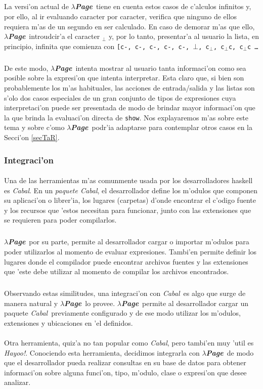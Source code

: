 \documentclass[a4paper]{article}
\newcommand{\hpage}{\textbf{\textsl{$\lambda$Page}}}
\newcommand{\cabal}{\textsl{Cabal}}
\begin{document}
\subparagraph{}La versi'on actual de \hpage\ tiene en cuenta estos casos de c'alculos infinitos y, por ello, al ir evaluando caracter por caracter, verifica que ninguno de ellos requiera m'as de un segundo en ser calculado.  En caso de demorar m'as que ello, \hpage\ introudcir'a el caracter  $_{\bot}$ y, por lo tanto, presentar'a al usuario la lista, en principio, infinita que comienza con \texttt{[c-, c-, c-, c-, c-, $\bot$, c$_{\bot}$, c$_{\bot}$c, c$_{\bot}$c \ldots}
\subparagraph{}De este modo, \hpage\ intenta mostrar al usuario tanta informaci'on como sea posible sobre la expresi'on que intenta interpretar.  Esta claro que, si bien son probablemente los m'as habituales, las acciones de entrada/salida y las listas son s'olo dos casos especiales de un gran conjunto de tipos de expresiones cuya interpretaci'on puede ser presentada de modo de brindar mayor informaci'on que la que brinda la evaluaci'on directa de \texttt{show}.  Nos explayaremos m'as sobre este tema y sobre c'omo \hpage\ podr'ia adaptarse para contemplar otros casos en la Secci'on \ref{secTaR}.

\subsubsection{Integraci'on}
\paragraph{}Una de las herramientas m'as comunmente usada por los desarrolladores haskell es \cabal.  En un \textsl{paquete Cabal}, el desarrollador define los m'odulos que componen su aplicaci'on o librer'ia, los lugares (carpetas) d'onde encontrar el c'odigo fuente y los recursos que 'estos necesitan para funcionar, junto con las extensiones que se requieren para poder compilarlos.
\subparagraph{}\hpage\ por su parte, permite al desarrollador cargar o importar m'odulos para poder utilizarlos al momento de evaluar expresiones.  Tambi'en permite definir los lugares donde el compilador puede encontrar archivos fuentes y las extensiones que 'este debe utilizar al momento de compilar los archivos encontrados.
\subparagraph{}Observando estas similitudes, una integraci'on con \cabal\ es algo que surge de manera natural y \hpage\ lo provee.  \hpage\ permite al desarrollador cargar un paquete \cabal\ previamente configurado y de ese modo utilizar los m'odulos, extensiones y ubicaciones en 'el definidos.
\paragraph{}Otra herramienta, quiz'a no tan popular como \cabal, pero tambi'en muy 'util es \textsl{Hayoo!}.  Conociendo esta herramienta, decidimos integrarla con \hpage\ de modo que el desarrollador pueda realizar consultas en su base de datos para obtener informaci'on sobre alguna funci'on, tipo, m'odulo, clase o expresi'on que desee analizar.
\end{document}
